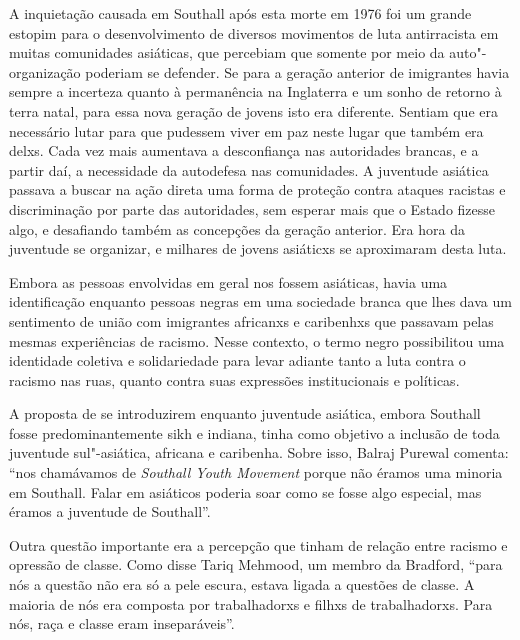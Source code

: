 A inquietação causada em Southall após esta morte em 1976 foi um grande estopim para o desenvolvimento de diversos movimentos de luta antirracista em muitas comunidades asiáticas, que percebiam que somente por meio da auto"-organização poderiam se defender. Se para a geração anterior de imigrantes havia sempre a incerteza quanto à permanência na Inglaterra e um sonho de retorno à terra natal, para essa nova geração de jovens isto era diferente. Sentiam que era necessário lutar para que pudessem viver em paz neste lugar que também era delxs. Cada vez mais aumentava a desconfiança nas autoridades brancas, e a partir daí, a necessidade da autodefesa nas comunidades. A juventude asiática passava a buscar na ação direta uma forma de proteção contra ataques racistas e discriminação por parte das autoridades, sem esperar mais que o Estado fizesse algo, e desafiando também as concepções da geração anterior. Era hora da juventude se organizar, e milhares de jovens asiáticxs se aproximaram desta luta.

Embora as pessoas envolvidas em geral nos  fossem asiáticas, havia uma identificação enquanto pessoas negras em uma sociedade branca que lhes dava um sentimento de união com imigrantes africanxs e caribenhxs que passavam pelas mesmas experiências de racismo. Nesse contexto, o termo negro possibilitou uma identidade coletiva e solidariedade para levar adiante tanto a luta contra o racismo nas ruas, quanto contra suas expressões institucionais e políticas.


A proposta de se introduzirem enquanto juventude asiática, embora Southall fosse predominantemente sikh e indiana, tinha como objetivo a inclusão de toda juventude sul"-asiática, africana e caribenha. Sobre isso, Balraj Purewal comenta: ``nos chamávamos de \emph{Southall Youth Movement} porque não éramos uma minoria em Southall. Falar em asiáticos poderia soar como se fosse algo especial, mas éramos a juventude de Southall''.

Outra questão importante era a percepção que tinham de relação entre racismo e opressão de classe. Como disse Tariq Mehmood, um membro da  Bradford, ``para nós a questão não era só a pele escura, estava ligada a questões de classe. A maioria de nós era composta por trabalhadorxs e filhxs de trabalhadorxs. Para nós, raça e classe eram inseparáveis''.

